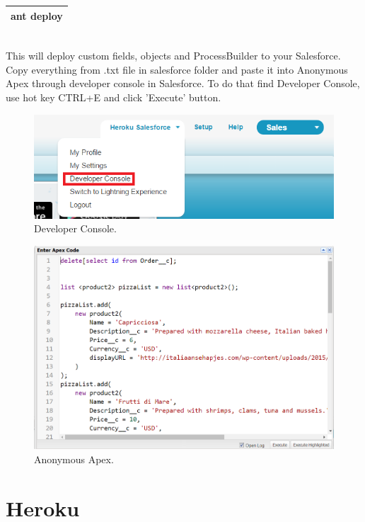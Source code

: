 \documentclass[12pt,a4paper]{article}
\begin{document}
\begin{tabular}{|l|}
	\hline
	ant deploy\\
	\hline
\end{tabular}\\


This will deploy custom fields, objects and ProcessBuilder to your Salesforce.\\
Copy everything from .txt file in salesforce folder and paste it into Anonymous Apex through developer console in Salesforce.
To do that find Developer Console, use hot key CTRL+E and click 'Execute' button.

\begin{figure}[H]
	\centering
	\includegraphics[width=1\textwidth]{images/deploy1.PNG}
	\caption{Developer Console.}
	\label{fig:console}
\end{figure}

\begin{figure}[H]
	\centering
	\includegraphics[width=1\textwidth]{images/deploy2.PNG}
	\caption{Anonymous Apex.}
	\label{fig:apex}
\end{figure}


\section{Heroku}
\end{document}
